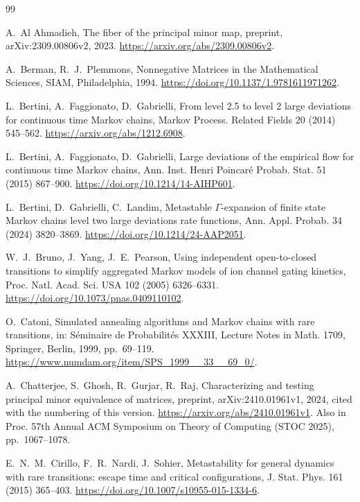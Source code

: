 \begin{thebibliography}{99}

A.~Al Ahmadieh, The fiber of the principal minor map, preprint, arXiv:2309.00806v2, 2023.
\url{https://arxiv.org/abs/2309.00806v2}.

A.~Berman, R.~J.~Plemmons, Nonnegative Matrices in the Mathematical Sciences, SIAM,
Philadelphia, 1994. \url{https://doi.org/10.1137/1.9781611971262}.

L.~Bertini, A.~Faggionato, D.~Gabrielli, From level 2.5 to level 2 large deviations for
continuous time Markov chains, Markov Process. Related Fields 20 (2014) 545--562.
\url{https://arxiv.org/abs/1212.6908}.

L.~Bertini, A.~Faggionato, D.~Gabrielli, Large deviations of the empirical flow for continuous
time Markov chains, Ann. Inst. Henri Poincar\'e Probab. Stat. 51 (2015) 867--900.
\url{https://doi.org/10.1214/14-AIHP601}.

L.~Bertini, D.~Gabrielli, C.~Landim, Metastable $\Gamma$-expansion of finite state Markov chains
level two large deviations rate functions, Ann. Appl. Probab. 34 (2024) 3820--3869.
\url{https://doi.org/10.1214/24-AAP2051}.

W.~J.~Bruno, J.~Yang, J.~E.~Pearson, Using independent open-to-closed transitions to simplify
aggregated Markov models of ion channel gating kinetics, Proc. Natl. Acad. Sci. USA 102 (2005)
6326--6331. \url{https://doi.org/10.1073/pnas.0409110102}.

O.~Catoni, Simulated annealing algorithms and Markov chains with rare transitions, in:
S\'eminaire de Probabilit\'es XXXIII, Lecture Notes in Math. 1709, Springer, Berlin, 1999,
pp.~69--119. \url{https://www.numdam.org/item/SPS_1999__33__69_0/}.

A.~Chatterjee, S.~Ghosh, R.~Gurjar, R.~Raj, Characterizing and testing principal minor
equivalence of matrices, preprint, arXiv:2410.01961v1, 2024, cited with the numbering of this
version. \url{https://arxiv.org/abs/2410.01961v1}. Also in Proc. 57th Annual ACM Symposium on
Theory of Computing (STOC 2025), pp.~1067--1078.

E.~N.~M.~Cirillo, F.~R.~Nardi, J.~Sohier, Metastability for general dynamics with rare
transitions: escape time and critical configurations, J. Stat. Phys. 161 (2015) 365--403.
\url{https://doi.org/10.1007/s10955-015-1334-6}.


\end{thebibliography}
